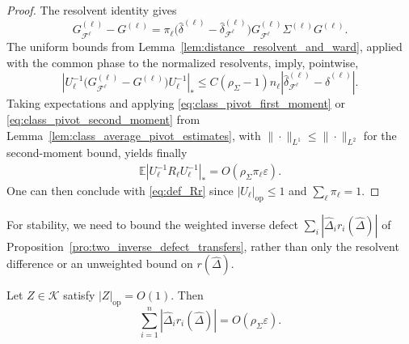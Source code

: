 \documentclass[EJP, preprint, NODS, nobera, nofontexpansion]{ejpecp}
\DeclareMathOperator{\op}{op}
\begin{document}
\begin{proof}
The resolvent identity gives
\begin{equation*}
    G_{\mathcal F^{\ell}}^{(\ell)}-G^{(\ell)}
    =\pi_{\ell}\bigl(
        \widehat\delta^{(\ell)}-\widehat\delta_{\mathcal F^{\ell}}^{(\ell)}
    \bigr)G_{\mathcal F^{\ell}}^{(\ell)}\Sigma^{(\ell)}G^{(\ell)}.
\end{equation*}
The uniform bounds from Lemma~\ref{lem:distance_resolvent_and_ward},
applied with the common phase to the normalized resolvents, imply,
pointwise,
\[
    \left|
        U_{\ell}^{-1}\bigl(G_{\mathcal F^{\ell}}^{(\ell)}-G^{(\ell)}\bigr)U_{\ell}^{-1}
    \right|_*
    \leq C(\rho_\Sigma-1)n_{\ell}
    \left|\widehat\delta_{\mathcal F^{\ell}}^{(\ell)}
        -\widehat\delta^{(\ell)}\right|.
\]
Taking expectations and applying
\eqref{eq:class_pivot_first_moment} or
\eqref{eq:class_pivot_second_moment} from
Lemma~\ref{lem:class_average_pivot_estimates}, with
$\|\cdot\|_{L^1}\leq\|\cdot\|_{L^2}$ for the second-moment bound, yields finally
\begin{align}
    \label{eq:normalized_stage_replacement}
    \mathbb E\left|
        U_{\ell}^{-1}R_{\ell}U_{\ell}^{-1}
    \right|_*
    =O\!\left(\rho_\Sigma\pi_{\ell}\varepsilon\right).
\end{align}
One can then conclude with \eqref{eq:def_Rr} since $|U_{\ell}|_{\op}\leq1$ and $\sum_{\ell}\pi_{\ell}=1$.
\end{proof}

For stability, we need to bound the weighted inverse
defect $\sum_i|\widehat\Delta_i r_i(\widehat\Delta)|$ of Proposition~\ref{pro:two_inverse_defect_transfers}, rather than only the resolvent difference
or an unweighted bound on $r(\widehat\Delta)$.

\begin{lemma}
\label{lem:classwise_weighted_inverse_defect}
Let $Z\in\mathcal K$ satisfy $|Z|_{\op}=O(1)$. Then
\begin{equation}
    \sum_{i=1}^n|\widehat\Delta_i r_i(\widehat\Delta)|
    =O\!\left(\rho_\Sigma\varepsilon\right).
\end{equation}
\end{lemma}
\end{document}
